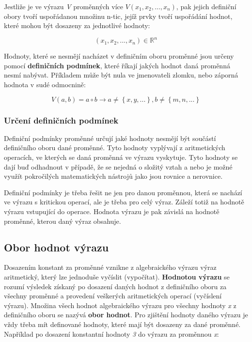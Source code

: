 \documentclass[11pt]{article}
\begin{document}
Jestliže je ve výrazu {\it V} proměnných více $ V(x_1, x_2 , ... , x_n)$, pak jejich definiční obory tvoří uspořádanou množinu n-tic, jejíž prvky tvoří uspořádání hodnot, které mohou být dosazeny za jednotlivé hodnoty:

$$ (x_1, x_2, ... , x_n) \in \mathbb{R}^n $$

Hodnoty, které se nesmějí nacházet v definičním oboru proměnné jsou určeny pomocí {\bf definičních podmínek}, které říkají jakých hodnot daná proměnná nesmí nabývat. Příkladem může být nula ve jmenovateli zlomku, nebo záporná hodnota v sudé odmocnině:

$$ V(a, b) = a \circ b \rightarrow a \not = \left\{x, y, ... \right\}, b \not = \left\{ m, n, ...\right\} $$

\subsubsection{Určení definičních podmínek}

Definiční podmínky proměnné určují jaké hodnoty nesmějí být součástí definičního oboru dané proměnné. Tyto hodnoty vyplývají z aritmetických operacích, ve kterých se daná proměnná ve výrazu vyskytuje. Tyto hodnoty se dají buď odhadnout v případě, že se nejedná o složitý vztah a nebo je možné využít pokročilých matematických nástrojů jako jsou rovnice a nerovnice. 

Definiční podmínky je třeba řešit ne jen pro danou proměnnou, která se nachází ve výrazu s kritickou operací, ale je třeba pro celý výraz. Záleží totiž na hodnotě výrazu vstupující do operace. Hodnota výrazu je pak závislá na hodnotě proměnné, kterou daný výraz obsahuje.


\subsection{Obor hodnot výrazu}

Dosazením konstant za proměnné vznikne z algebraického výrazu výraz aritmetický, který lze jednoduše vyčíslit (vypočítat). {\bf Hodnotou výrazu} se rozumí výsledek získaný po dosazení daných hodnot z definičního oboru za všechny proměnné a provedení veškerých aritmetických operací (vyčíslení výrazu). Množina všech hodnot algebraického výrazu pro všechny hodnoty {\it x} z definičního oboru se nazývá {\bf obor hodnot}. Pro zjištění hodnoty daného výrazu je vždy třeba mít definované hodnoty, které mají být dosazeny za dané proměnné. Například po dosazení konstantní hodnoty {\it 3} do výrazu za proměnnou {\it x}:
\end{document}
